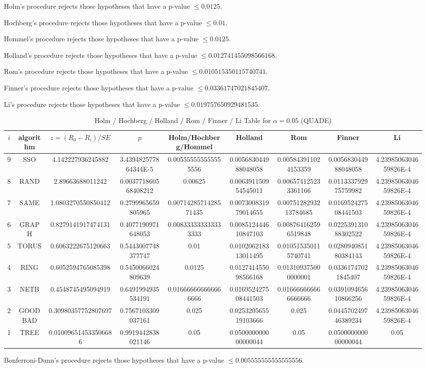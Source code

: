 \documentclass[a4paper,10pt]{article}
\begin{document}
\begin{landscape}
Holm's procedure rejects those hypotheses that have a p-value $\le0.0125$.


Hochberg's procedure rejects those hypotheses that have a p-value $\le0.01$.


Hommel's procedure rejects those hypotheses that have a p-value $\le0.0125$.


Holland's procedure rejects those hypotheses that have a p-value $\le0.012741455098566168$.


Rom's procedure rejects those hypotheses that have a p-value $\le0.010515350115740741$.


Finner's procedure rejects those hypotheses that have a p-value $\le0.03361747021845407$.


Li's procedure rejects those hypotheses that have a p-value $\le0.019757650929481535$.



\newpage

\begin{table}[!htp]
\centering\scriptsize
\caption{Holm / Hochberg / Holland / Rom / Finner / Li Table for $\alpha=0.05$ (QUADE)}
\begin{tabular}{ccccccccc}
$i$&algorithm&$z=(R_0 - R_i)/SE$&$p$&Holm/Hochberg/Hommel&Holland&Rom&Finner&Li\\
\hline
9& SSO&4.142227936245882&3.439482577864344E-5&0.005555555555555556&0.005683044988048058&0.005843911024153359&0.005683044988048058&4.2398506304659826E-4\\
8& RAND&2.89663688011242&0.003771860568408212&0.00625&0.006391150954545011&0.006574125233361166&0.011333792975759982&4.2398506304659826E-4\\
7& SAME&1.0803270550850412&0.2799965659805965&0.0071428571428571435&0.007300831979014655&0.0075128293213784685&0.016952427508441503&4.2398506304659826E-4\\
6& GRAPH&0.8279141917474131&0.4077190971648053&0.008333333333333333&0.008512444610847103&0.008764162596519848&0.022539131088302522&4.2398506304659826E-4\\
5& TORUS&0.6063222675120663&0.5443007748377747&0.01&0.010206218313011495&0.010515350115740741&0.028094085180384143&4.2398506304659826E-4\\
4& RING&0.6052594765085398&0.5450066024809639&0.0125&0.012741455098566168&0.013109375000000001&0.03361747021845407&4.2398506304659826E-4\\
3& NETB&0.4548745495094919&0.6491994935534191&0.016666666666666666&0.016952427508441503&0.016666666666666666&0.039109465610866256&4.2398506304659826E-4\\
2& GOODBAD&0.30980357752807697&0.7567103309037161&0.025&0.025320565519103666&0.025&0.044570249746389234&4.2398506304659826E-4\\
1& TREE&0.010096514533506686&0.9919442838021146&0.05&0.050000000000000044&0.05&0.050000000000000044&0.05\\
\hline
\end{tabular}
\end{table}
Bonferroni-Dunn's procedure rejects those hypotheses that have a p-value $\le0.005555555555555556$.



\end{landscape}
\end{document}
